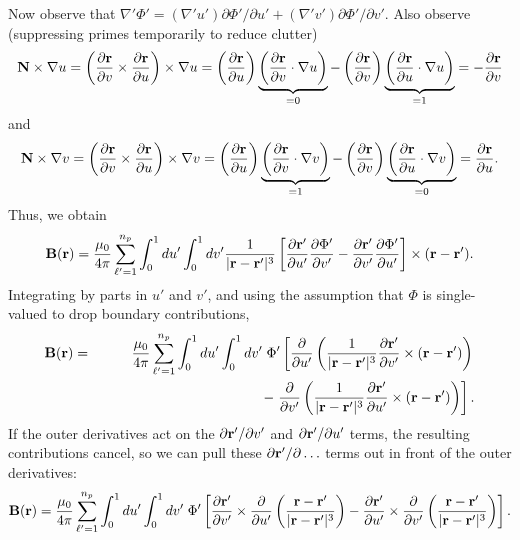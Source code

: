 Now observe that $\nabla'\Phi' = (\nabla' u')\partial\Phi'/\partial u' + (\nabla' v')\partial\Phi'/\partial v'$.
Also observe
(suppressing primes temporarily to reduce clutter)
\begin{equation}
{\mathbf N}\times\nabla u
=\left(\frac{\partial{\mathbf r}}{\partial v}\times\frac{\partial {\mathbf r}}{\partial u}\right)
\times\nabla u
=
\left(\frac{\partial{\mathbf r}}{\partial u}\right)
\underbrace{\left(\frac{\partial{\mathbf r}}{\partial v}\cdot\nabla u\right)}_{=0}
-
\left(\frac{\partial{\mathbf r}}{\partial v}\right)
\underbrace{\left(\frac{\partial{\mathbf r}}{\partial u}\cdot\nabla u\right)}_{=1}
=
-\frac{\partial{\mathbf r}}{\partial v}
\end{equation}
and
\begin{equation}
{\mathbf N}\times\nabla v
=\left(\frac{\partial{\mathbf r}}{\partial v}\times\frac{\partial {\mathbf r}}{\partial u}\right)
\times\nabla v
=
\left(\frac{\partial{\mathbf r}}{\partial u}\right)
\underbrace{\left(\frac{\partial{\mathbf r}}{\partial v}\cdot\nabla v\right)}_{=1}
-
\left(\frac{\partial{\mathbf r}}{\partial v}\right)
\underbrace{\left(\frac{\partial{\mathbf r}}{\partial u}\cdot\nabla v\right)}_{=0}
=
\frac{\partial{\mathbf r}}{\partial u}.
\end{equation}
Thus, we obtain
\begin{equation}
{\mathbf B}({\mathbf r}) = \frac{\mu_0}{4\pi}
\sum_{\ell'=1}^{n_p} \int_0^1 du' \int_0^1 dv' \frac{1}{|{\mathbf r}-{\mathbf r}'|^3}
\left[ \frac{\partial{\mathbf r}'}{\partial u'} \frac{\partial\Phi'}{\partial v'}
- \frac{\partial{\mathbf r}'}{\partial v'} \frac{\partial\Phi'}{\partial u'} \right]
\times({\mathbf r}-{\mathbf r}').
\end{equation}
Integrating by parts in $u'$ and $v'$,
and using the assumption that $\Phi$ is single-valued to drop boundary contributions,
\begin{eqnarray}
{\mathbf B}({\mathbf r}) 
&=& \frac{\mu_0}{4\pi}
\sum_{\ell'=1}^{n_p} \int_0^1 du' \int_0^1 dv' \; \Phi'
\left[
\frac{\partial}{\partial u'}
\left(  \frac{1}{|{\mathbf r}-{\mathbf r}'|^3}
\frac{\partial {\mathbf r}'}{\partial v'}\times ({\mathbf r}-{\mathbf r}')
\right) \right. \\
&&
\hspace{1.6in}-
\left.
\frac{\partial}{\partial v'}
\left( \frac{1}{|{\mathbf r}-{\mathbf r}'|^3}
\frac{\partial {\mathbf r}'}{\partial u'}\times ({\mathbf r}-{\mathbf r}')
\right)
\right]. \nonumber
\end{eqnarray}
If the outer derivatives act on the $\partial{\mathbf r}'/\partial v'$
and $\partial{\mathbf r}'/\partial u'$ terms, the resulting contributions cancel,
so we can pull these $\partial{\mathbf r}'/\partial \ldots$ terms out in front of the outer
derivatives:
\begin{equation}
{\mathbf B}({\mathbf r}) = \frac{\mu_0}{4\pi}
\sum_{\ell'=1}^{n_p} \int_0^1 du' \int_0^1 dv' \; \Phi'
\left[
\frac{\partial{\mathbf r}'}{\partial v'}
\times
\frac{\partial}{\partial u'}
\left(  \frac{{\mathbf r}-{\mathbf r}'}{|{\mathbf r}-{\mathbf r}'|^3}
\right)
-
\frac{\partial{\mathbf r}'}{\partial u'}
\times
\frac{\partial}{\partial v'}
\left( \frac{{\mathbf r}-{\mathbf r}'}{|{\mathbf r}-{\mathbf r}'|^3}
\right)
\right].
\label{eq:13}
\end{equation}

